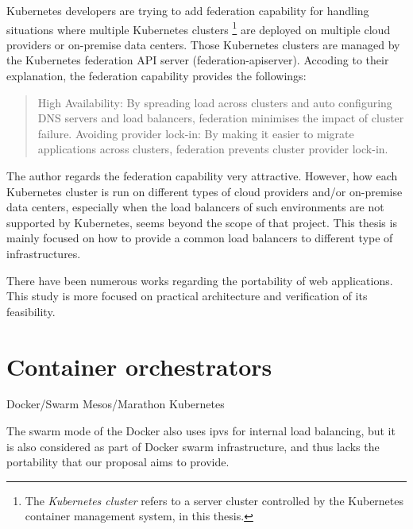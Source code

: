 Kubernetes developers are trying to add federation \cite{K8sFederation2017} capability for handling situations 
where multiple Kubernetes clusters \footnote{The {\em Kubernetes cluster} refers to a server cluster 
controlled by the Kubernetes container management system, in this thesis.} 
are deployed on multiple cloud providers or on-premise data centers. 
Those Kubernetes clusters are managed by the Kubernetes federation API server (federation-apiserver).
Accoding to their explanation\cite{K8sFederation2017}, the federation capability provides the followings: 
\begin{quote}
High Availability: By spreading load across clusters and auto configuring DNS servers and load balancers, federation minimises the impact of cluster failure.
Avoiding provider lock-in: By making it easier to migrate applications across clusters, federation prevents cluster provider lock-in.
\end{quote}
The author regards the federation capability very attractive.
However, how each Kubernetes cluster is run on different types of cloud providers
and/or on-premise data centers, especially when the load balancers of such environments are not supported by Kubernetes, 
seems beyond the scope of that project.
This thesis is mainly focused on how to provide a common load balancers to different type of infrastructures. 

There have been numerous works regarding the portability of web applications.
This study is more focused on practical architecture and verification of its feasibility.

\section{Container orchestrators}

Docker/Swarm
Mesos/Marathon
Kubernetes

The swarm mode of the Docker\cite{DockerCoreEngineering2016,DockerInc2017} also uses ipvs for internal load balancing,
but it is also considered as part of Docker swarm infrastructure, 
and thus lacks the portability that our proposal aims to provide.

